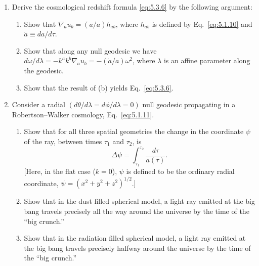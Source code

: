 \begin{enumerate}[label=\arabic*.,leftmargin=*]
\item Derive the cosmological redshift formula \eqref{eq:5.3.6} by the following
argument:
\begin{enumerate}[label=\alph*),leftmargin=2.5em]
\item Show that \(\nabla_a u_b=(\dot a/a)h_{ab}\), where \(h_{ab}\) is defined by
Eq.~\eqref{eq:5.1.10} and \(\dot a\equiv da/d\tau\).

\item Show that along any null geodesic we have
\(d\omega/d\lambda=-k^a k^b\nabla_a u_b=-(\dot a/a)\omega^2\), where \(\lambda\)
is an affine parameter along the geodesic.

\item Show that the result of (b) yields Eq.~\eqref{eq:5.3.6}.
\end{enumerate}

\item Consider a radial \((d\theta/d\lambda=d\phi/d\lambda=0)\) null geodesic
propagating in a Robertson--Walker cosmology, Eq.~\eqref{eq:5.1.11}.
\begin{enumerate}[label=\alph*),leftmargin=2.5em]
\item Show that for all three spatial geometries the change in the coordinate \(\psi\)
of the ray, between times \(\tau_1\) and \(\tau_2\), is
\begin{equation*}
  \Delta\psi=\int_{\tau_1}^{\tau_2}\frac{d\tau}{a(\tau)}.
\end{equation*}
[Here, in the flat case (\(k=0\)), \(\psi\) is defined to be the ordinary radial
coordinate, \(\psi=(x^2+y^2+z^2)^{1/2}\).]

\item Show that in the dust filled spherical model, a light ray emitted at the big bang
travels precisely all the way around the universe by the time of the ``big crunch.''

\item Show that in the radiation filled spherical model, a light ray emitted at the big
bang travels precisely halfway around the universe by the time of the ``big crunch.''
\end{enumerate}
\end{enumerate}
